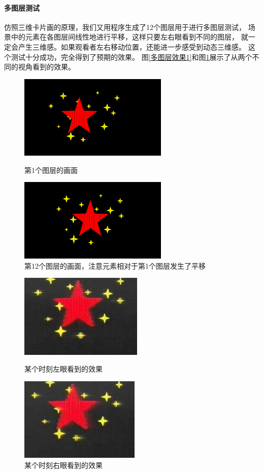 \documentclass[12pt,a4paper]{article}
\begin{document}
\paragraph{多图层测试}
仿照三维卡片画的原理，我们又用程序生成了12个图层用于进行多图层测试，
场景中的元素在各图层间线性地进行平移，这样只要左右眼看到不同的图层，
就一定会产生三维感。如果观看者左右移动位置，还能进一步感受到动态三维感。
这个测试十分成功，完全得到了预期的效果。
图\ref{多图层效果1}和图\ref{多图层效果2}展示了从两个不同的视角看到的效果。
\begin{figure}
    \begin{minipage}[t]{0.5\linewidth}
    \centering\includegraphics[height=4cm]{121}
    \caption{第1个图层的画面}
    \end{minipage}\begin{minipage}[t]{0.5\linewidth}
    \centering\includegraphics[height=4cm]{1212}
    \caption{第12个图层的画面，注意元素相对于第1个图层发生了平移}
    \end{minipage}
\end{figure}
\begin{figure}
    \begin{minipage}[t]{0.5\linewidth}
    \centering\includegraphics[height=4cm]{12l}
    \caption{某个时刻左眼看到的效果}
    \label{多图层效果1}
    \end{minipage}\begin{minipage}[t]{0.5\linewidth}
    \centering\includegraphics[height=4cm]{12r}
    \caption{某个时刻右眼看到的效果}
    \label{多图层效果2}
    \end{minipage}
\end{figure}
\end{document}
